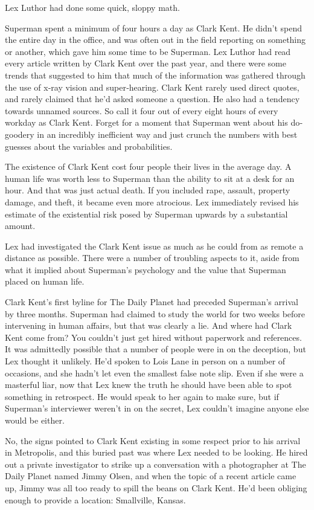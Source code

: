 \documentclass[ebook,12pt]{memoir}
\begin{document}
Lex Luthor had done some quick, sloppy math.

Superman spent a minimum of four hours a day as Clark Kent. He didn't
spend the entire day in the office, and was often out in the field
reporting on something or another, which gave him some time to be
Superman. Lex Luthor had read every article written by Clark Kent over
the past year, and there were some trends that suggested to him that
much of the information was gathered through the use of x‐ray vision and
super‐hearing. Clark Kent rarely used direct quotes, and rarely claimed
that he'd asked someone a question. He also had a tendency towards
unnamed sources. So call it four out of every eight hours of every
workday as Clark Kent. Forget for a moment that Superman went about his
do‐goodery in an incredibly inefficient way and just crunch the numbers
with best guesses about the variables and probabilities.

The existence of Clark Kent cost four people their lives in the average
day. A human life was worth less to Superman than the ability to sit at
a desk for an hour. And that was just actual death. If you included
rape, assault, property damage, and theft, it became even more
atrocious. Lex immediately revised his estimate of the existential risk
posed by Superman upwards by a substantial amount.

Lex had investigated the Clark Kent issue as much as he could from as
remote a distance as possible. There were a number of troubling aspects
to it, aside from what it implied about Superman's psychology and the
value that Superman placed on human life.

Clark Kent's first byline for The Daily Planet had preceded Superman's
arrival by three months. Superman had claimed to study the world for two
weeks before intervening in human affairs, but that was clearly a lie.
And where had Clark Kent come from? You couldn't just get hired without
paperwork and references. It was admittedly possible that a number of
people were in on the deception, but Lex thought it unlikely. He'd
spoken to Lois Lane in person on a number of occasions, and she hadn't
let even the smallest false note slip. Even if she were a masterful
liar, now that Lex knew the truth he should have been able to spot
something in retrospect. He would speak to her again to make sure, but
if Superman's interviewer weren't in on the secret, Lex couldn't imagine
anyone else would be either.

No, the signs pointed to Clark Kent existing in some respect prior to
his arrival in Metropolis, and this buried past was where Lex needed to
be looking. He hired out a private investigator to strike up a
conversation with a photographer at The Daily Planet named Jimmy Olsen,
and when the topic of a recent article came up, Jimmy was all too ready
to spill the beans on Clark Kent. He'd been obliging enough to provide a
location: Smallville, Kansas.
\end{document}
